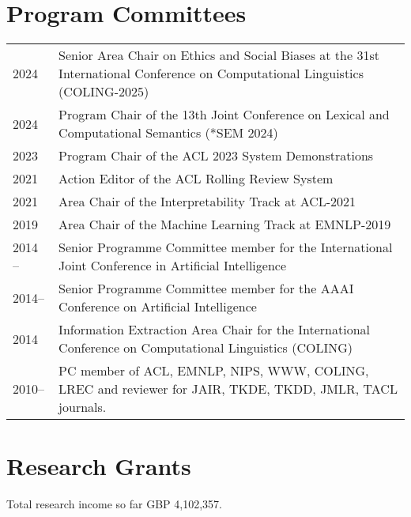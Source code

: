 \documentclass[a4paper,11pt]{article}
\begin{document}
\section{Program Committees}
\begin{tabular}{l p{13cm}}
2024 & Senior Area Chair on Ethics and Social Biases at the 31st International Conference on Computational Linguistics (COLING-2025)\\
2024 & Program Chair of the 13th Joint Conference on Lexical and Computational Semantics (*SEM 2024)\\
2023 & Program Chair of the ACL 2023 System Demonstrations \\
2021 & Action Editor of the ACL Rolling Review System \\
2021 & Area Chair of the Interpretability Track at ACL-2021\\
2019 & Area Chair of the Machine Learning Track at EMNLP-2019\\
2014 -- & Senior Programme Committee member for the International Joint Conference in Artificial Intelligence\\
2014-- & Senior Programme Committee member for the AAAI Conference on Artificial Intelligence\\
2014 & Information Extraction Area Chair for the International Conference on Computational Linguistics (COLING)\\
2010-- & PC member of ACL, EMNLP, NIPS, WWW, COLING, LREC and reviewer for JAIR, TKDE, TKDD, JMLR, TACL journals.
\end{tabular}



\section{Research Grants}

Total research income so far GBP 4,102,357.
\end{document}

